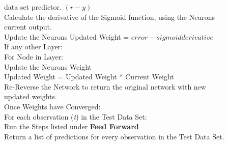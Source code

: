 \documentclass[twoside,11pt]{article}
\newcommand\tab[1][1cm]{\hspace*{#1}}
\begin{document}
\tab \tab \tab \tab \tab data set predictor. $(r-y)$\\
\tab \tab \tab \tab Calculate the derivative of the Sigmoid function, using the Neurons\\
\tab \tab \tab \tab current output.\\
\tab \tab \tab \tab Update the Neurons Updated Weight  = $error - sigmoid derivative$\\
\tab \tab \tab \tab If any other Layer:\\
\tab \tab \tab \tab \tab For Node in Layer:\\
\tab \tab \tab \tab \tab \tab Update the Neurons Weight\\
\tab \tab \tab \tab \tab \tab Updated Weight = Updated Weight * Current Weight\\
\tab \tab Re-Reverse the Network to return the original network with new\\ 
\tab \tab updated weights.\\
\tab Once Weights have Converged:\\
\tab For each observation (\textit{t}) in the Test Data Set:\\
\tab \tab Run the Steps listed under \textbf{Feed Forward}\\
\tab Return a list of predictions for every observation in the Test Data Set.\\
\end{document}
